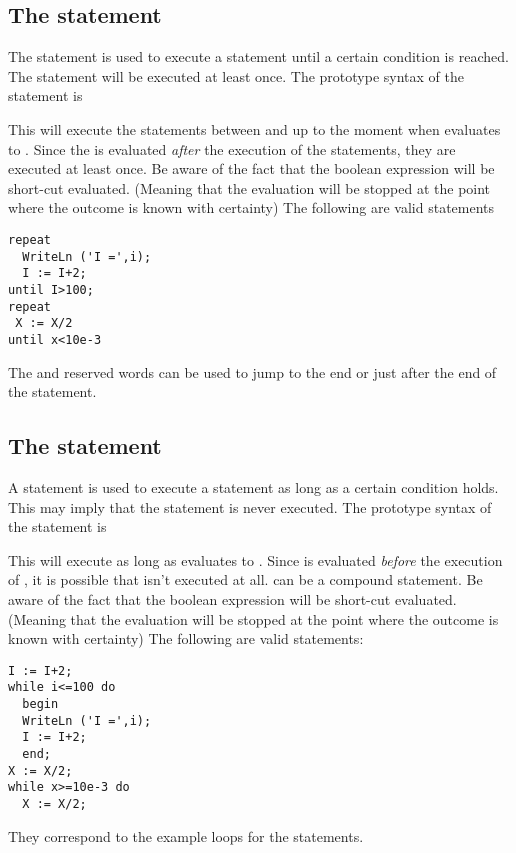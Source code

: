\subsection{The  statement}
The  statement is used to execute a statement until a certain
condition is reached. The statement will be executed at least once.
The prototype syntax of the  statement is

This will execute the statements between  and  up to
the moment when  evaluates to .
Since the  is evaluated {\em after} the execution of the
statements, they are executed at least once.
Be aware of the fact that the boolean expression  will be
short-cut evaluated. (Meaning that the evaluation will be stopped at the
point where the outcome is known with certainty)
The following are valid  statements
\begin{verbatim}
repeat
  WriteLn ('I =',i);
  I := I+2;
until I>100;
repeat
 X := X/2
until x<10e-3
\end{verbatim}
The  and  reserved words can be used to jump to
the end or just after the end of the  statement.

\subsection{The  statement}
A  statement is used to execute a statement as long as a certain
condition holds. This may imply that the statement is never executed.
The prototype syntax of the  statement is

This will execute  as long as  evaluates to
. Since  is evaluated {\em before} the execution
of , it is possible that  isn't executed at
all.  can be a compound statement.
Be aware of the fact that the boolean expression  will be
short-cut evaluated. (Meaning that the evaluation will be stopped at the
point where the outcome is known with certainty)
The following are valid  statements:
\begin{verbatim}
I := I+2;
while i<=100 do
  begin
  WriteLn ('I =',i);
  I := I+2;
  end;
X := X/2;
while x>=10e-3 do
  X := X/2;
\end{verbatim}
They correspond to the example loops for the  statements.


